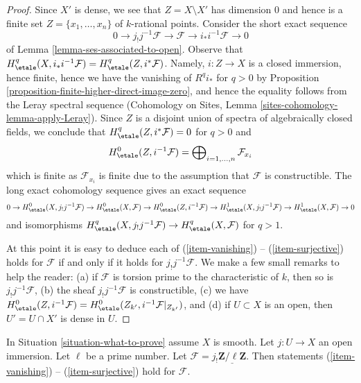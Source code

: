 \begin{proof}
Since $X'$ is dense, we see that $Z = X \setminus X'$ has dimension $0$
and hence is a finite set $Z = \{x_1, \ldots, x_n\}$ of $k$-rational points.
Consider the short exact sequence
$$
0 \to j_!j^{-1}\mathcal{F} \to \mathcal{F} \to i_*i^{-1}\mathcal{F} \to 0
$$
of Lemma \ref{lemma-ses-associated-to-open}. Observe that
$H^q_\etale(X, i_*i^{-1}\mathcal{F}) = H^q_\etale(Z, i^*\mathcal{F})$.
Namely, $i : Z \to X$ is a closed immersion, hence finite,
hence we have the vanishing of $R^qi_*$ for $q > 0$ by
Proposition \ref{proposition-finite-higher-direct-image-zero}, and
hence the equality follows from the Leray spectral sequence
(Cohomology on Sites, Lemma \ref{sites-cohomology-lemma-apply-Leray}).
Since $Z$ is a disjoint union of spectra of algebraically closed
fields, we conclude that $H^q_\etale(Z, i^*\mathcal{F}) = 0$
for $q > 0$ and
$$
H^0_\etale(Z, i^{-1}\mathcal{F}) =
\bigoplus\nolimits_{i = 1, \ldots, n} \mathcal{F}_{x_i}
$$
which is finite as $\mathcal{F}_{x_i}$ is finite due to the
assumption that $\mathcal{F}$ is constructible.
The long exact cohomology sequence gives an exact sequence
$$
0 \to
H^0_\etale(X, j_!j^{-1}\mathcal{F}) \to
H^0_\etale(X, \mathcal{F}) \to
H^0_\etale(Z, i^{-1}\mathcal{F}) \to
H^1_\etale(X, j_!j^{-1}\mathcal{F}) \to
H^1_\etale(X, \mathcal{F}) \to 0
$$
and isomorphisms $H^q_\etale(X, j_!j^{-1}\mathcal{F}) \to
H^q_\etale(X, \mathcal{F})$ for $q > 1$.

\medskip\noindent
At this point it is easy to deduce each of 
(\ref{item-vanishing}) -- (\ref{item-surjective})
holds for $\mathcal{F}$ if and only if it holds for
$j_!j^{-1}\mathcal{F}$. We make a few small remarks to help the reader:
(a) if $\mathcal{F}$ is torsion prime to the characteristic
of $k$, then so is $j_!j^{-1}\mathcal{F}$,
(b) the sheaf $j_!j^{-1}\mathcal{F}$ is constructible,
(c) we have $H^0_\etale(Z, i^{-1}\mathcal{F}) =
H^0_\etale(Z_{k'}, i^{-1}\mathcal{F}|_{Z_{k'}})$, and (d)
if $U \subset X$ is an open, then $U' = U \cap X'$ is dense in $U$.
\end{proof}

\begin{lemma}
\label{lemma-even-easier}
In Situation \ref{situation-what-to-prove} assume $X$ is smooth.
Let $j : U \to X$ an open immersion. Let $\ell$ be a prime number.
Let $\mathcal{F} = j_!\underline{\mathbf{Z}/\ell\mathbf{Z}}$.
Then statements (\ref{item-vanishing}) -- (\ref{item-surjective}) hold
for $\mathcal{F}$.
\end{lemma}


